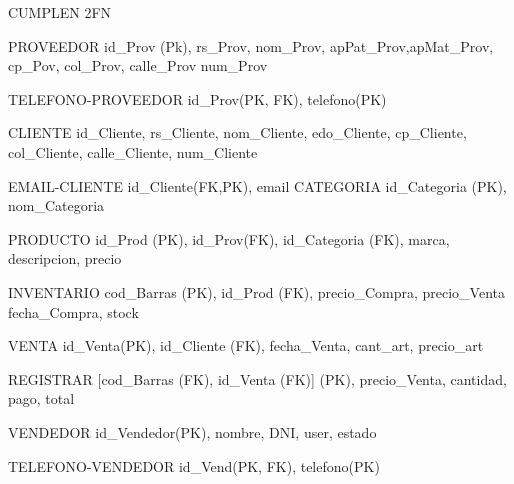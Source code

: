 \documentclass[30pt,fleqn]{article}
\begin{document}
 \vspace{10mm} %
 
 \vspace{10mm} %
CUMPLEN 2FN
\vspace{10mm} %

 PROVEEDOR {id_Prov (Pk), rs_Prov, nom_Prov, apPat_Prov,apMat_Prov, cp_Pov, col_Prov, calle_Prov num_Prov}
 
 \vspace{10mm} %
 
TELEFONO-PROVEEDOR {id_Prov(PK, FK), telefono(PK) } 

\vspace{10mm} %

CLIENTE{ id_Cliente, rs_Cliente, nom_Cliente, edo_Cliente, cp_Cliente, col_Cliente, calle_Cliente, num_Cliente}

\vspace{10mm} %

EMAIL-CLIENTE {id_Cliente(FK,PK), email} 
CATEGORIA {id_Categoria (PK), nom_Categoria}

\vspace{10mm} %

PRODUCTO {id_Prod (PK), id_Prov(FK), id_Categoria (FK), marca, descripcion, precio}

\vspace{10mm} %

INVENTARIO { cod_Barras (PK), id_Prod (FK), precio_Compra, precio_Venta fecha_Compra, stock} 

\vspace{10mm} %

VENTA {id_Venta(PK), id_Cliente (FK), fecha_Venta, cant_art, precio_art}

\vspace{10mm} %

REGISTRAR {[cod_Barras (FK), id_Venta (FK)] (PK), precio_Venta, cantidad, pago, total}

\vspace{10mm} %

VENDEDOR {id_Vendedor(PK), nombre, DNI, user, estado}

 \vspace{10mm} %
 
TELEFONO-VENDEDOR {id_Vend(PK, FK), telefono(PK) } 


 \vspace{10mm} %
\end{document}
